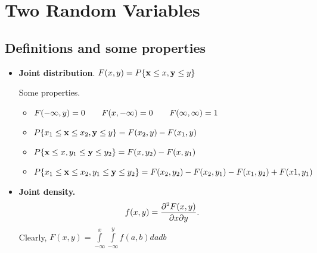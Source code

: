 \documentclass[a4paper, oneside]{book}
\begin{document}
\chapter{Two Random Variables} 

\section{Definitions and some properties}

\begin{itemize}
\item \textbf{Joint distribution}. $F(x,y) = P\{\mathbf x \le x, \mathbf y \le y\}$

Some properties.
	\begin{itemize}
	\item $F(-\infty,y) = 0 \hspace{0.7truecm} F(x,-\infty)=0 \hspace{0.7truecm} F(\infty, \infty)=1$
	\item $P\{x_1 \le \mathbf x \le x_2, \mathbf y \le y\} = F(x_2,y) - F(x_1, y)$
	\item $P\{\mathbf x \le x, y_1 \le \mathbf y \le y_2\} = F(x,y_2) - F(x, y_1)$
	\item $P\{x_1 \le \mathbf x \le x_2, y_1 \le \mathbf y \le y_2\} = F(x_2, y_2) - F(x_2, y_1) - F(x_1, y_2) + F(x1, y_1)$
	\end{itemize}

\item \textbf{Joint density.} $$f(x,y) = \frac{\partial^2 F(x,y)}{\partial x \partial y}.$$ Clearly, $F(x,y) = \int\limits_{-\infty}^x \int\limits_{-\infty}^y f(a,b)dadb$


\end{itemize}
\end{document}
